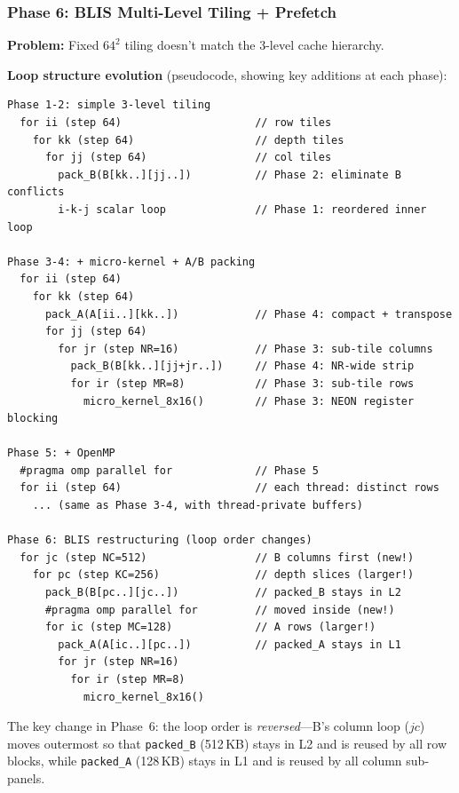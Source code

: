 \documentclass[11pt,a4paper]{article}
\begin{document}
\subsubsection{Phase 6: BLIS Multi-Level Tiling + Prefetch}

\textbf{Problem:} Fixed $64^2$ tiling doesn't match the 3-level cache hierarchy.

\textbf{Loop structure evolution} (pseudocode, showing key additions at each phase):

\begin{lstlisting}[language={},basicstyle=\ttfamily\scriptsize,
  frame=single,xleftmargin=0.5em,numbers=none,
  moredelim={**[is][\color{red}\bfseries]{@@}{@@}},
  moredelim={**[is][\color{blue}\bfseries]{!!}{!!}}]
Phase 1-2: simple 3-level tiling
  for ii (step 64)                     // row tiles
    for kk (step 64)                   // depth tiles
      for jj (step 64)                 // col tiles
        pack_B(B[kk..][jj..])          // Phase 2: eliminate B conflicts
        i-k-j scalar loop              // Phase 1: reordered inner loop

Phase 3-4: + micro-kernel + A/B packing
  for ii (step 64)
    for kk (step 64)
      pack_A(A[ii..][kk..])            // Phase 4: compact + transpose
      for jj (step 64)
        for jr (step NR=16)            // Phase 3: sub-tile columns
          pack_B(B[kk..][jj+jr..])     // Phase 4: NR-wide strip
          for ir (step MR=8)           // Phase 3: sub-tile rows
            micro_kernel_8x16()        // Phase 3: NEON register blocking

Phase 5: + OpenMP
  #pragma omp parallel for             // Phase 5
  for ii (step 64)                     // each thread: distinct rows
    ... (same as Phase 3-4, with thread-private buffers)

Phase 6: BLIS restructuring (loop order changes)
  for jc (step NC=512)                 // B columns first (new!)
    for pc (step KC=256)               // depth slices (larger!)
      pack_B(B[pc..][jc..])            // packed_B stays in L2
      #pragma omp parallel for         // moved inside (new!)
      for ic (step MC=128)             // A rows (larger!)
        pack_A(A[ic..][pc..])          // packed_A stays in L1
        for jr (step NR=16)
          for ir (step MR=8)
            micro_kernel_8x16()
\end{lstlisting}

The key change in Phase~6: the loop order is \emph{reversed}---B's column loop ($jc$) moves outermost so that \texttt{packed\_B} (512\,KB) stays in L2 and is reused by all row blocks,
while \texttt{packed\_A} (128\,KB) stays in L1 and is reused by all column sub-panels.
\end{document}
